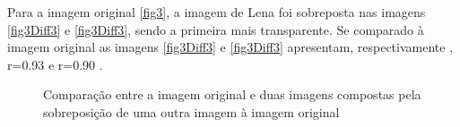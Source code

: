 \documentclass[10pt,a4paper]{article}
\begin{document}
\vspace{-0.5cm}
Para a imagem original \ref{fig3}, a imagem de Lena foi sobreposta nas
imagens \ref{fig3Diff3} e \ref{fig3Diff3}, sendo a primeira mais
transparente.
Se comparado à imagem original as imagens \ref{fig3Diff3} e
\ref{fig3Diff3} apresentam, respectivamente , r=0.93 e r=0.90 . 
\begin{figure}[h!]
\begin{center}
\hspace{10mm}
\caption{Comparação entre a imagem original e duas imagens compostas pela sobreposição
  de uma outra imagem à imagem original}
\end{center}
\end{figure}
\end{document}
